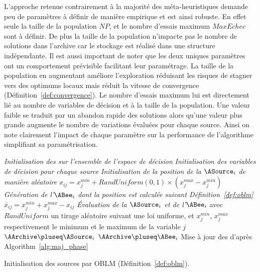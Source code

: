 L’approche retenue contrairement à la majorité des méta-heuristiques demande
peu de paramètres à définir de manière empirique et est ainsi robuste. En effet
seule la taille de la population $NP$, et le nombre d’essais maximum $MaxEchec$ sont à définir.
De plus la taille de la population n’impacte pas le nombre de solutions dans l’archive
car le stockage est réalisé dans une structure indépendante. Il est aussi important
de noter que les deux uniques paramètres ont un comportement prévisible facilitant
leur paramétrage. La taille de la population en augmentant améliore l’exploration
réduisant les risques de stagner vers des optimums locaux mais réduit la vitesse
de convergence (Définition~\ref{def:convergence}).
Le nombre d’essais maximum lui est directement lié au nombre de variables de décision
et à la taille de la population. Une valeur faible se traduit par un abandon rapide
des solutions alors qu’une valeur plus grande augmente le nombre de variations évaluées
pour chaque source. Ainsi on note clairement l’impact de chaque paramètre sur la
performance de l’algorithme simplifiant sa paramétrisation.

\begin{algorithm}\label{alg:init_phase}
  \SetAlgoVlined
  \DontPrintSemicolon
  \emph{Initialisation des \ASources sur l’ensemble de l’espace de décision}\;
  {
    \emph{Initialisation des variables de décision pour chaque source}\;
    {
       \emph{Initialisation de la position de la $\ASource_{i}$ de manière aléatoire}\;
      \Indp
      $x_{ij} = x_{j}^{min} + RandUniform(0, 1) \times (x_{j}^{max} - x_{j}^{min})$\;
      \Indm
      \BlankLine
        \emph{Génération de l’$\ABee_{i}$ dont la position est calculée suivant Définition~\ref{def:oblm}}\;
      \Indp
      $ \check{x_{ij}} = x_{j}^{min} + x_{j}^{max} - x_{ij}$\;
      \Indm
      \BlankLine
       \emph{Évaluation de la $\ASource_{i}$ et de l’$\ABee_{i}$}\;
      \BlankLine
      avec $RandUniform$ un tirage aléatoire suivant une loi uniforme, et $x_{j}^{min}$, $x_{j}^{max}$
      respectivement le minimum et le maximum de la variable $j$\;
    }
    {
      $\AArchive \pluseq \ASource_{i}$ 
    }
    {
      $\AArchive \pluseq \ABee_{i}$ 
    }
  }
  Mise à jour des \ASources d’après Algorithm~\ref{alg:maj_phase}\;
  \caption{Initialisation des sources par OBLM (Définition~\ref{def:oblm}).}
\end{algorithm}

